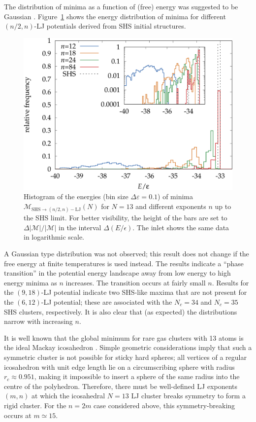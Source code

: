 The distribution of minima as a function of (free) energy was suggested to be
Gaussian \autocite{Sciortino-1999}. Figure~\ref{fig:N13-steps} shows the energy
distribution of minima for different $(n/2,n)$-\ac{LJ} potentials derived from
\ac{SHS} initial structures.
%
\begin{figure}[htb]
    \centering
    \includegraphics[width=0.8\columnwidth]{kslj/N13-steps.pdf}
    \caption{Histogram of the energies (bin size $\Delta\varepsilon=0.1$) of
    minima $\mathcal{M}_{\text{SHS}\to (n/2,n)-\text{LJ}}(N)$ for $N=13$ and
    different exponents $n$ up to the \acs{SHS} limit. For better visibility,
    the height of the bars are set to $\Delta|\mathcal{M}|/|\mathcal{M}|$ in the
    interval $\Delta(E/\epsilon)$. The inlet shows the same data in logarithmic
    scale.}
    \label{fig:N13-steps}
\end{figure}
%
A Gaussian type distribution was not observed; this result does not change if
the free energy at finite temperatures is used instead. The results indicate a
``phase transition'' in the potential energy landscape away from low energy to
high energy minima as $n$ increases. The transition occurs at fairly small $n$.
Results for the $(9,18)$-\ac{LJ} potential indicate two \ac{SHS}-like maxima
that are not present for the $(6,12)$-\ac{LJ} potential; these are associated
with the $N_c = 34$ and $N_c = 35$ \ac{SHS} clusters, respectively. It is also
clear that (as expected) the distributions narrow with increasing $n$.

It is well known that the global minimum for rare gas clusters with 13 atoms is
the ideal Mackay icosahedron
\autocite{Hoare_Physicalclustermechanics_1975,Hoare_Statisticalmechanicsmorphology_1976,Hoare_StructureDynamicsSimple_2007}.
Simple geometric considerations imply that such a symmetric cluster is not
possible for sticky hard spheres; all vertices of a regular icosahedron with
unit edge length lie on a circumscribing sphere with radius $r_c\approx 0.951$,
making it impossible to insert a sphere of the same radius into the centre of
the polyhedron. Therefore, there must be well-defined \ac{LJ} exponents $(m,n)$
at which the icosahedral $N = 13$ \ac{LJ} cluster breaks symmetry to form a
rigid cluster. For the $n = 2m$ case considered above, this symmetry-breaking
occurs at $m \simeq 15$.

